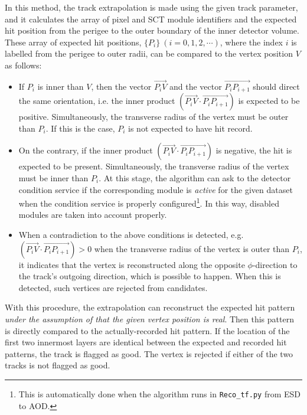 \documentclass[NOTE, atlasdraft=true, texlive=2018, UKenglish]{\ATLASLATEXPATH atlasdoc}
\begin{document}
\begin{enumerate}
In this method, the track extrapolation is made using the given track parameter, and it calculates the array of pixel and SCT module identifiers and the expected hit position from the perigee to the outer boundary of the inner detector volume. These array of expected hit positions, $\{P_{i}\}~(i=0, 1, 2,\cdots)$, where the index $i$ is labelled from the perigee to outer radii, can be compared to the vertex position $V$ as follows:
  \begin{itemize}
  \item If $P_{i}$ is inner than $V$, then the vector $\overrightarrow{P_{i}V}$ and the vector $\overrightarrow{P_{i}P_{i+1}}$ should direct the same orientation, i.e. the inner product $(\overrightarrow{P_{i}V}\cdot\overrightarrow{P_{i}P_{i+1}})$ is expected to be positive. Simultaneously, the transverse radius of the vertex must be outer than $P_{i}$. If this is the case, $P_{i}$ is not expected to have hit record.
  \item On the contrary, if the inner product $(\overrightarrow{P_{i}V}\cdot\overrightarrow{P_{i}P_{i+1}})$ is negative, the hit is expected to be present. Simultaneously, the transverse radius of the vertex must be inner than $P_{i}$. At this stage, the algorithm can ask to the detector condition service if the corresponding module is \emph{active} for the given dataset when the condition service is properly configured\footnote{This is automatically done when the algorithm runs in {\tt Reco\_tf.py} from ESD to AOD.}. In this way, disabled modules are taken into account properly.
  \item When a contradiction to the above conditions is detected, e.g.~$(\overrightarrow{P_{i}V}\cdot\overrightarrow{P_{i}P_{i+1}})>0$ when the transverse radius of the vertex is outer than $P_{i}$, it indicates that the vertex is reconstructed along the opposite $\phi$-direction to the track's outgoing direction, which is possible to happen. When this is detected, such vertices are rejected from candidates.
  \end{itemize}
  With this procedure, the extrapolation can reconstruct the expected hit pattern \emph{under the assumption of that the given vertex position is real}. Then this pattern is directly compared to the actually-recorded hit pattern. If the location of the first two innermost layers are identical between the expected and recorded hit patterns, the track is flagged as good. The vertex is rejected if either of the two tracks is not flagged as good.
\end{enumerate}
\end{document}
